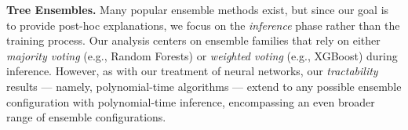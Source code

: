 \documentclass{article}
\newcommand{\mysubsection}[1]{\medskip\noindent\textbf{#1}}
\newcommand{\z}{\textbf{z}}
\newcommand{\x}{\textbf{x}}
\begin{document}




\mysubsection{Tree Ensembles.} Many popular ensemble methods exist, but since our goal is to provide post-hoc explanations, we focus on the \emph{inference} phase rather than the training process. Our analysis centers on ensemble families that rely on either \emph{majority voting} (e.g., Random Forests) or \emph{weighted voting} (e.g., XGBoost) during inference. However, as with our treatment of neural networks, our \emph{tractability} results --- namely, polynomial-time algorithms --- extend to any possible ensemble configuration with polynomial-time inference, encompassing an even broader range of ensemble configurations.
    
\end{document}

